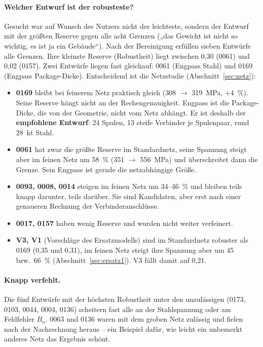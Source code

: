 \paragraph{Welcher Entwurf ist der robusteste?} Gesucht war auf Wunsch des Nutzers nicht der leichteste, sondern der
Entwurf mit der größten Reserve gegen alle acht Grenzen („das Gewicht ist nicht so wichtig, es ist ja ein
Gebäude“). Nach der Bereinigung erfüllen sieben Entwürfe alle Grenzen. Ihre kleinste Reserve (Robustheit) liegt
zwischen 0,30 (0061) und 0,02 (0157). Zwei Entwürfe liegen fast gleichauf: 0061 (Engpass Stahl) und 0169 (Engpass
Package-Dicke). Entscheidend ist die Netzstudie (Abschnitt~\ref{sec:netz}):

\begin{itemize}
\item \textbf{0169} bleibt bei feinerem Netz praktisch gleich (\SI{308}{} $\to$ \SI{319}{MPa}, $+4$~\%). Seine
  Reserve hängt nicht an der Rechengenauigkeit. Engpass ist die Package-Dicke, die von der Geometrie, nicht vom
  Netz abhängt. Er ist deshalb der \textbf{empfohlene Entwurf}: 24 Spulen, 13 steife Verbinder je Spulenpaar,
  rund \SI{28}{kt} Stahl.
\item \textbf{0061} hat zwar die größte Reserve im Standardnetz, seine Spannung steigt aber im feinen Netz um 58~\%
  (\SI{351}{} $\to$ \SI{556}{MPa}) und überschreitet dann die Grenze. Sein Engpass ist gerade die netzabhängige
  Größe.
\item \textbf{0093, 0008, 0014} steigen im feinen Netz um 34--46~\% und bleiben teils knapp darunter, teils
  darüber. Sie sind Kandidaten, aber erst nach einer genaueren Rechnung der Verbinderanschlüsse.
\item \textbf{0017, 0157} haben wenig Reserve und wurden nicht weiter verfeinert.
\item \textbf{V3, V1} (Vorschläge des Ersatzmodells) sind im Standardnetz robuster als 0169 (0,35 und 0,31), im
  feinen Netz steigt ihre Spannung aber um 45 bzw.\ 66~\% (Abschnitt~\ref{sec:ersatz1}). V3 fällt damit auf 0,21.
\end{itemize}

\paragraph{Knapp verfehlt.} Die fünf Entwürfe mit der höchsten Robustheit unter den unzulässigen (0173, 0103, 0044,
0004, 0136) scheitern fast alle an der Stahlspannung oder am Feldfehler $B_n$. 0063 und 0136 waren mit dem groben
Netz zulässig und fielen nach der Nachrechnung heraus -- ein Beispiel dafür, wie leicht ein unbemerkt anderes Netz
das Ergebnis schönt.

